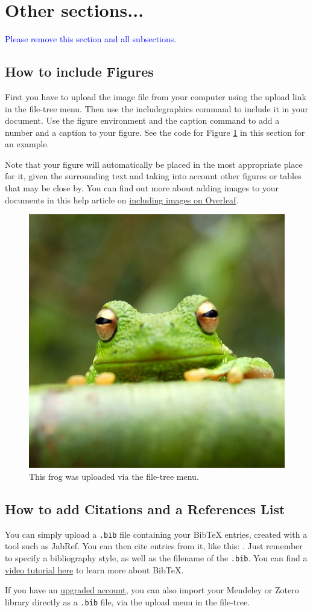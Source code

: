\documentclass{article}
\begin{document}
\section{Other sections...}

\textcolor{blue}{Please remove this section and all subsections.}
\subsection{How to include Figures}

First you have to upload the image file from your computer using the upload link in the file-tree menu. Then use the includegraphics command to include it in your document. Use the figure environment and the caption command to add a number and a caption to your figure. See the code for Figure \ref{fig:frog} in this section for an example.

Note that your figure will automatically be placed in the most appropriate place for it, given the surrounding text and taking into account other figures or tables that may be close by. You can find out more about adding images to your documents in this help article on \href{https://www.overleaf.com/learn/how-to/Including_images_on_Overleaf}{including images on Overleaf}.

\begin{figure}
    \centering
    \includegraphics[width=0.25\linewidth]{Figures/frog.jpg}
    \caption{\label{fig:frog}This frog was uploaded via the file-tree menu.}
\end{figure}


\subsection{How to add Citations and a References List}

You can simply upload a \verb|.bib| file containing your BibTeX entries, created with a tool such as JabRef. You can then cite entries from it, like this: \cite{greenwade93}. Just remember to specify a bibliography style, as well as the filename of the \verb|.bib|. You can find a \href{https://www.overleaf.com/help/97-how-to-include-a-bibliography-using-bibtex}{video tutorial here} to learn more about BibTeX.

If you have an \href{https://www.overleaf.com/user/subscription/plans}{upgraded account}, you can also import your Mendeley or Zotero library directly as a \verb|.bib| file, via the upload menu in the file-tree.




\end{document}
